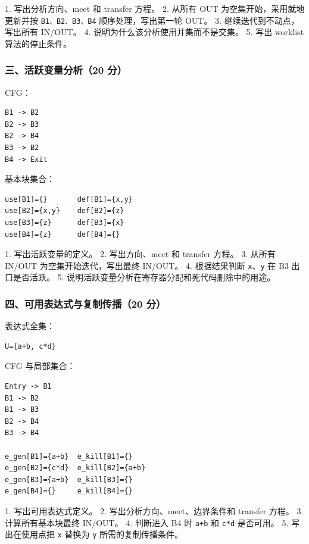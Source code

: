 \documentclass[UTF8]{ctexart}
\begin{document}
1. 写出分析方向、meet 和 transfer 方程。 2. 从所有 OUT 为空集开始，采用就地更新并按 \texttt{B1、B2、B3、B4} 顺序处理，写出第一轮 OUT。 3. 继续迭代到不动点，写出所有 IN/OUT。 4. 说明为什么该分析使用并集而不是交集。 5. 写出 worklist 算法的停止条件。

\subsubsection*{三、活跃变量分析（20 分）}

CFG：

\begin{Verbatim}[fontsize=\small,breaklines=true]
B1 -> B2
B2 -> B3
B2 -> B4
B3 -> B2
B4 -> Exit
\end{Verbatim}

基本块集合：

\begin{Verbatim}[fontsize=\small,breaklines=true]
use[B1]={}       def[B1]={x,y}
use[B2]={x,y}    def[B2]={z}
use[B3]={z}      def[B3]={x}
use[B4]={z}      def[B4]={}
\end{Verbatim}

1. 写出活跃变量的定义。 2. 写出方向、meet 和 transfer 方程。 3. 从所有 IN/OUT 为空集开始迭代，写出最终 IN/OUT。 4. 根据结果判断 \texttt{x}、\texttt{y} 在 B3 出口是否活跃。 5. 说明活跃变量分析在寄存器分配和死代码删除中的用途。

\subsubsection*{四、可用表达式与复制传播（20 分）}

表达式全集：

\begin{Verbatim}[fontsize=\small,breaklines=true]
U={a+b, c*d}
\end{Verbatim}

CFG 与局部集合：

\begin{Verbatim}[fontsize=\small,breaklines=true]
Entry -> B1
B1 -> B2
B1 -> B3
B2 -> B4
B3 -> B4

e_gen[B1]={a+b}  e_kill[B1]={}
e_gen[B2]={c*d}  e_kill[B2]={a+b}
e_gen[B3]={a+b}  e_kill[B3]={}
e_gen[B4]={}     e_kill[B4]={}
\end{Verbatim}

1. 写出可用表达式定义。 2. 写出分析方向、meet、边界条件和 transfer 方程。 3. 计算所有基本块最终 IN/OUT。 4. 判断进入 B4 时 \texttt{a+b} 和 \texttt{c*d} 是否可用。 5. 写出在使用点把 \texttt{x} 替换为 \texttt{y} 所需的复制传播条件。
\end{document}

